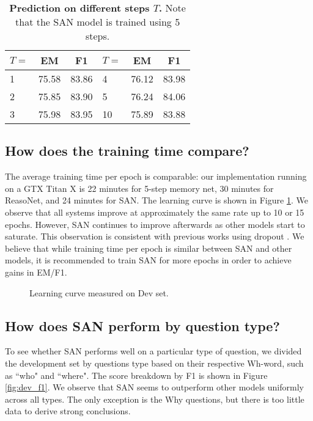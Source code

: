 \documentclass[11pt,a4paper]{article}
\begin{document}
\begin{table}[t!]
\centering
\begin{tabular}{@{\hskip1pt} l ||@{\hskip1pt} c |@{\hskip1pt} c |@{\hskip1pt} l |@{\hskip1pt} c |@{\hskip1pt} c}
\hline
$T=$	&EM&F1 &$T=$	&EM&F1\\ \hline\hline
1 &75.58 &83.86 &4 &76.12 &83.98\\ \hline
2 &75.85 &83.90 &5 &76.24 &84.06 \\ \hline
3 &75.98 &83.95 &10 &75.89 &83.88 \\ \hline
\end{tabular}
\caption{\label{tab:comp_pre_step} 
\textbf{Prediction on different steps $T$.} Note that the SAN model is trained using 5 steps.} 
\end{table}

\subsection{How does the training time compare?}
The average training time per epoch is comparable: our implementation running on a GTX Titan X
is 22 minutes for 5-step memory net, 30 minutes for ReasoNet, and 24 minutes for SAN. 
The learning curve is shown in Figure \ref{fig:dev_curve}.
We observe that all systems improve at approximately the same rate up to 10 or 15 epochs. 
However, SAN continues to improve afterwards as other models start to saturate. 
This observation is consistent with previous works using dropout \cite{srivastava2014dropout}. 
We believe that while training time per epoch is similar between SAN and other models, it is recommended to train SAN for more epochs in order to achieve gains in EM/F1. 

\begin{figure}[t!]
\centering  
{}
\caption{\label{fig:dev_curve} Learning curve measured on Dev set.}
\end{figure}

\subsection{How does SAN perform by question type?}
To see whether SAN performs well on a particular type of question, we divided the development set by questions type based on their respective Wh-word, such as ``who" and ``where". 
The score breakdown by F1 is shown in Figure \ref{fig:dev_f1}. 
We observe that SAN seems to outperform other models uniformly across all types. 
The only exception is the Why questions, but there is too little data to derive strong conclusions. 
\end{document}
